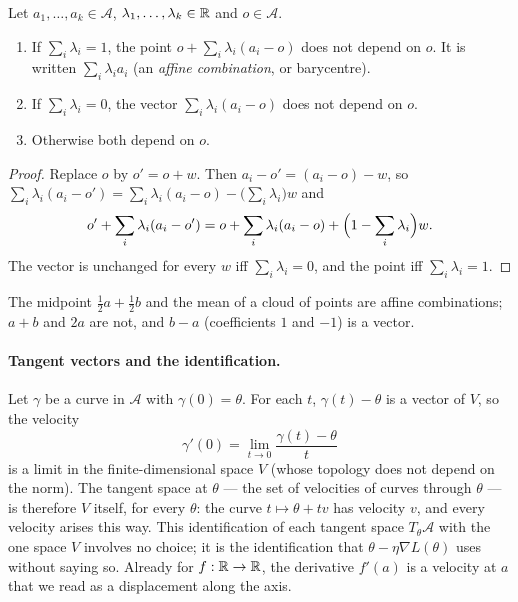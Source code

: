 \begin{notechapter}
\begin{proposition}\label{gradient-tangent-space:prop:affine-comb}
Let $a_1,\dots,a_k\in\mathcal A$, $\lambda_1,\dots,\lambda_k\in\mathbb{R}$ and $o\in\mathcal A$.
\begin{enumerate}[nosep]
  \item If $\sum_i\lambda_i = 1$, the point $o + \sum_i\lambda_i(a_i - o)$ does not depend on $o$. It is written
        $\sum_i\lambda_ia_i$ (an \emph{affine combination}, or barycentre).
  \item If $\sum_i\lambda_i = 0$, the vector $\sum_i\lambda_i(a_i - o)$ does not depend on $o$.
  \item Otherwise both depend on $o$.
\end{enumerate}
\end{proposition}

\begin{proof}
Replace $o$ by $o' = o + w$. Then $a_i - o' = (a_i - o) - w$, so
$\sum_i\lambda_i(a_i - o') = \sum_i\lambda_i(a_i - o) - \bigl(\sum_i\lambda_i\bigr)w$ and
\[
  o' + \sum_i\lambda_i(a_i - o') = o + \sum_i\lambda_i(a_i - o) + \Bigl(1 - \sum_i\lambda_i\Bigr)w .
\]
The vector is unchanged for every $w$ iff $\sum_i\lambda_i = 0$, and the point iff $\sum_i\lambda_i = 1$.
\end{proof}

The midpoint $\frac12a + \frac12b$ and the mean of a cloud of points are affine combinations; $a + b$ and
$2a$ are not, and $b - a$ (coefficients $1$ and $-1$) is a vector.

\paragraph{Tangent vectors and the identification.} Let $\gamma$ be a curve in $\mathcal A$ with $\gamma(0) = \theta$.
For each $t$, $\gamma(t) - \theta$ is a vector of $V$, so the velocity
\[
  \gamma'(0) = \lim_{t\to0}\frac{\gamma(t) - \theta}{t}
\]
is a limit in the finite-dimensional space $V$ (whose topology does not depend on the norm). The
tangent space at $\theta$ --- the set of velocities of curves through $\theta$ --- is therefore $V$ itself,
for every $\theta$: the curve $t\mapsto\theta + tv$ has velocity $v$, and every velocity arises this way. This
identification of each tangent space $T_\theta\mathcal A$ with the one space $V$ involves no choice; it is the
identification that $\theta - \eta\nabla L(\theta)$ uses without saying so. Already for $f:\mathbb{R}\to\mathbb{R}$, the derivative
$f'(a)$ is a velocity at $a$ that we read as a displacement along the axis.


\end{notechapter}
